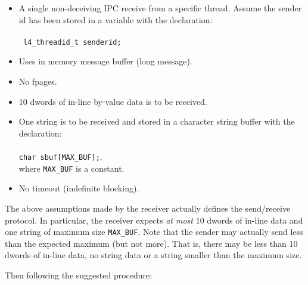 \begin{itemize}

\item A single non-deceiving IPC receive from a specific thread. Assume the sender id has been 
  stored in a variable with the declaration: \\ \\
  \hspace*{10pt} {\footnotesize\verb+ l4_threadid_t senderid;+}
\item Uses in memory message buffer (long message).
\item No fpages.
\item 10 dwords of in-line by-value data is to be received.
\item One string is to be received and stored in a character string buffer with the declaration: \\ \\
  \hspace*{10pt} {\footnotesize\verb+char sbuf[MAX_BUF];+}.\\
  \hspace*{15pt} where {\footnotesize\verb+MAX_BUF+} is a constant.
\item No timeout (indefinite blocking).
  
\end{itemize}

The above assumptions made by the receiver actually defines the
send/receive protocol. In particular, the receiver expects \emph{at
  most} 10 dwords of in-line data and one string of maximum size
{\footnotesize\verb+MAX_BUF+}. Note that the sender may actually send less than the
expected maximum (but not more). That is, there may be less than 10
dwords of in-line data, no string data or a string smaller than the
maximum size.

Then following the suggested procedure:

